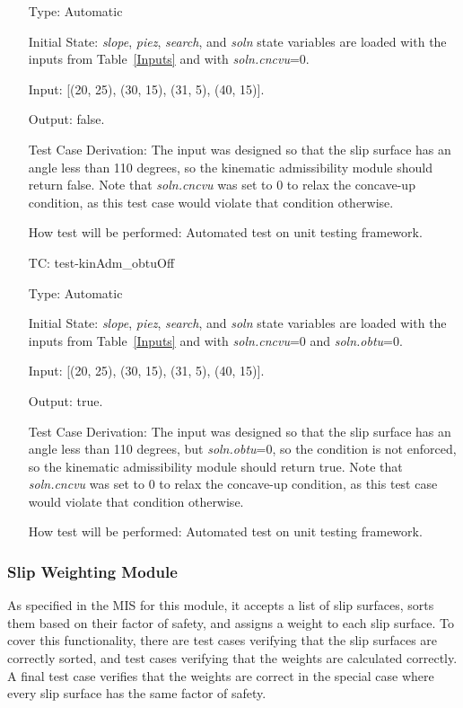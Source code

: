 \documentclass[12pt, titlepage]{article}
\newcounter{utestnum} %
\begin{document}
\begin{enumerate}[label=TC\arabic*:,ref={\arabic*}]
	Type: Automatic
	
	Initial State: \textit{slope}, \textit{piez}, \textit{search}, and 
	\textit{soln} state variables are loaded with the inputs from 
	Table~\ref{Inputs} and with \textit{soln.cncvu}=0.
	
	Input: [(20, 25), (30, 15), (31, 5), (40, 15)].
	
	Output: false.
	
	Test Case Derivation: The input was designed so that the slip surface has 
	an angle less than 110 degrees, so the kinematic admissibility module 
	should return false. Note that \textit{soln.cncvu} was set to 0 to relax 
	the concave-up condition, as this test case would violate that condition 
	otherwise.
	
	How test will be performed: Automated test on unit testing framework.
	
	\item [TC\refstepcounter{utestnum}\theutestnum: \label{TC_KinAdmObtuOff}] 
	test-kinAdm\_obtuOff
	
	Type: Automatic
	
	Initial State: \textit{slope}, \textit{piez}, \textit{search}, and 
	\textit{soln} state variables are loaded with the inputs from 
	Table~\ref{Inputs} and with \textit{soln.cncvu}=0 and \textit{soln.obtu}=0.
	
	Input: [(20, 25), (30, 15), (31, 5), (40, 15)].
	
	Output: true.
	
	Test Case Derivation: The input was designed so that the slip surface has 
	an angle less than 110 degrees, but \textit{soln.obtu}=0, so the condition 
	is not enforced, so the kinematic admissibility module should return true. 
	Note that \textit{soln.cncvu} was set to 0 to relax the concave-up 
	condition, as this test case would violate that condition otherwise.
	
	How test will be performed: Automated test on unit testing framework.
	
\end{enumerate}

\subsubsection{Slip Weighting Module}
As specified in the MIS for this module, it accepts a list of slip surfaces, 
sorts them based on their factor of safety, and assigns a weight to each slip 
surface. To cover this functionality, there are test cases verifying that the 
slip surfaces are correctly sorted, and test cases verifying that the 
weights are calculated correctly. A final test case verifies that the weights 
are correct in the special case where every slip surface has the same factor of 
safety.
\end{document}
